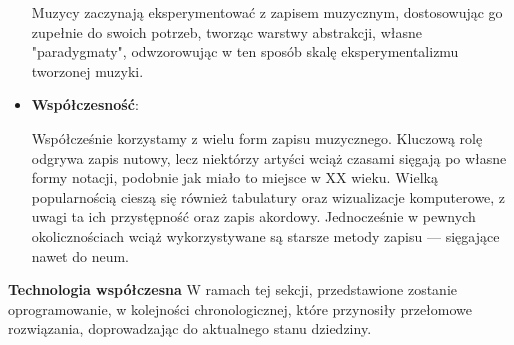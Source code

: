 \documentclass[12pt]{article}
\begin{document}
\begin{itemize}
	      Muzycy zaczynają eksperymentować z zapisem muzycznym, dostosowując go zupełnie do swoich potrzeb, tworząc warstwy abstrakcji,
	      własne "paradygmaty", odwzorowując w ten sposób skalę eksperymentalizmu tworzonej muzyki.
	\item \textbf{Współczesność}:
	      
	      Współcześnie korzystamy z wielu form zapisu muzycznego. Kluczową rolę odgrywa zapis nutowy,
	      lecz niektórzy artyści wciąż czasami sięgają po własne formy notacji, podobnie jak miało to miejsce w XX wieku.
	      Wielką popularnością cieszą się również tabulatury oraz wizualizacje komputerowe, z uwagi ta ich przystępność oraz zapis akordowy.
	      Jednocześnie w pewnych okolicznościach wciąż wykorzystywane są starsze metody zapisu — sięgające nawet do neum.
\end{itemize}

\textbf{Technologia współczesna}
W ramach tej sekcji, przedstawione zostanie oprogramowanie, w kolejności chronologicznej, które przynosiły przełomowe rozwiązania, doprowadzając do aktualnego stanu dziedziny.
\end{document}
